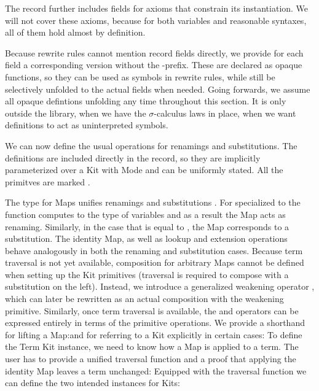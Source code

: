\documentclass[screen,nonacm]{acmart}
\begin{document}
\noindent The  record further includes fields for axioms that constrain
its instantiation. We will not cover these axioms, because for both variables
and reasonable syntaxes, all of them hold almost by definition.

Because rewrite rules cannot mention record fields directly, we provide for
each field a corresponding version without the -prefix. These are
declared as opaque functions, so they can be used as symbols in rewrite rules,
while still be selectively unfolded to the actual fields when needed. Going
forwards, we assume all opaque defintions unfolding any time throughout this
section. It is only outside the library, when we have the $σ$-calculus laws in
place, when we want definitions to act as uninterpreted symbols.

We can now define the usual operations for renamings and substitutions. The
definitions are included directly in the  record, so they are
implicitly parameterized over a Kit  with Mode  and
can be uniformly stated. All the primitves are marked .

\begin{minipage}[t]{0.48\linewidth}
      \raggedright{}
      \AMapA{}
\end{minipage}
\begin{minipage}[t]{0.48\linewidth}
      \raggedright{}
      \AMapB{}
\end{minipage}

\noindent The type for Maps    unifies
renamings    and substitutions
  . For  specialized
to  the  function computes to
the type of variables and as a result the Map acts as renaming. Similarly, in
the case that  is equal to , the Map
corresponds to a substitution. The identity Map, as well as lookup and
extension operations behave analogously in both the renaming and substitution
cases. Because term traversal is not yet available, composition for arbitrary
Maps cannot be defined when setting up the Kit primitives (traversal is
required to compose with a substitution on the left). Instead, we introduce a
generalized weakening operator , which can later be
rewritten as an actual composition with the weakening primitive. Similarly,
once term traversal is available, the  and
 operators can be expressed entirely in terms of the
primitive operations. We provide a shorthand for lifting a Map:\ALifting{}and
for referring to a Kit explicitly in certain cases: \AKitExplicit{}To define
the Term Kit instance, we need to know how a Map is applied to a term. The user
has to provide a unified traversal function and a proof that applying the
identity Map leaves a term unchanged: \ATraversal{}Equipped with the traversal
function we can define the two intended instances for Kits:
\end{document}
